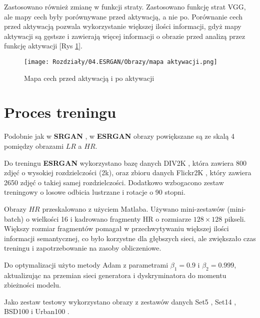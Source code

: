 Zastosowano również zmianę w funkcji straty. Zastosowano funkcję strat VGG, ale mapy cech były porównywane przed aktywacją, a nie po. Porównanie cech przed aktywacją pozwala wykorzystanie większej ilości informacji, gdyż mapy aktywacji są gęstsze i zawierają więcej informacji o obrazie przed analizą przez funkcję aktywacji [Rys \ref{fig:image65}].

\begin{figure}[ht]
    \centering
    \begin{minipage}[t]{0.85\linewidth}
        \texttt{[image: Rozdziały/04.ESRGAN/Obrazy/mapa aktywacji.png]}
        \caption{Mapa cech przed aktywacją i po aktywacji \cite{wang2018esrgan}}
        \label{fig:image65}
    \end{minipage}
\end{figure}



\section{Proces treningu}

Podobnie jak w \textbf{SRGAN} \cite{Ledig_2017_CVPR}, w \textbf{ESRGAN} \cite{wang2018esrgan} obrazy powiększane są ze skalą 4 pomiędzy obrazami $LR$ a $HR$. 

Do treningu \textbf{ESRGAN} wykorzystano bazę danych DIV2K \cite{Agustsson_2017_CVPR_Workshops}, która zawiera 800 zdjęć o wysokiej rozdzielczości (2k), oraz zbioru danych Flickr2K %
, który zawiera 2650 zdjęć o takiej samej rozdzielczości. Dodatkowo wzbogacono zestaw treningowy o losowe odbicia lustrzane i rotacje o 90 stopni.


Obrazy $HR$ przeskalowano z użyciem Matlaba. Używano mini-zestawów (mini-batch) o wielkości 16 i kadrowano fragmenty HR o rozmiarze $128 \times 128$ pikseli. Większy rozmiar fragmentów pomagał w przechwytywaniu większej ilości informacji semantycznej, co było korzystne dla głębszych sieci, ale zwiększało czas treningu i zapotrzebowanie na zasoby obliczeniowe.

Do optymalizacji użyto metody Adam z parametrami \( \beta_1 = 0.9 \) i \( \beta_2 = 0.999 \), aktualizując na przemian sieci generatora i dyskryminatora do momentu zbieżności modelu.

Jako zestaw testowy wykorzystano obrazy z zestawów danych Set5 \cite{bevilacqua2012low}, Set14 \cite{zeyde2010single}, BSD100 \cite{martin2001database} i Urban100 \cite{Huang_2015_CVPR}.



